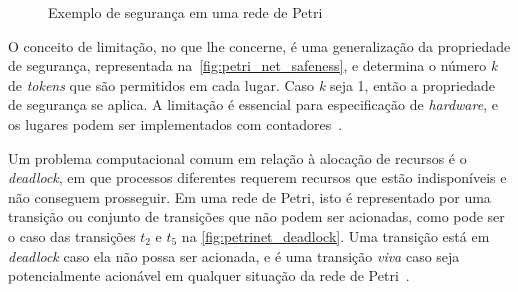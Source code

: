 \begin{figure}[ht]
    \centering
    \caption{Exemplo de segurança em uma rede de Petri}
    \label{fig:petri_net_safeness}
        \hspace{0.1cm}
\end{figure}

O conceito de limitação, no que lhe concerne, é uma generalização da propriedade de segurança, representada na~\autoref{fig:petri_net_safeness}, e determina o número \textit{k} de \textit{tokens} que são permitidos em cada lugar. Caso \textit{k} seja 1, então a propriedade de segurança se aplica. A limitação é essencial para especificação de \textit{hardware}, e os lugares podem ser implementados com contadores~\cite{peterson:1981}.

Um problema computacional comum em relação à alocação de recursos é o \textit{deadlock}, em que processos diferentes requerem recursos que estão indisponíveis e não conseguem prosseguir. Em uma rede de Petri, isto é representado por uma transição ou conjunto de transições que não podem ser acionadas, como pode ser o caso das transições $t_2$ e $t_5$ na \autoref{fig:petrinet_deadlock}. Uma transição está em \textit{deadlock} caso ela não possa ser acionada, e é uma transição \textit{viva} caso seja potencialmente acionável em qualquer situação da rede de Petri~\cite{peterson:1981}.

